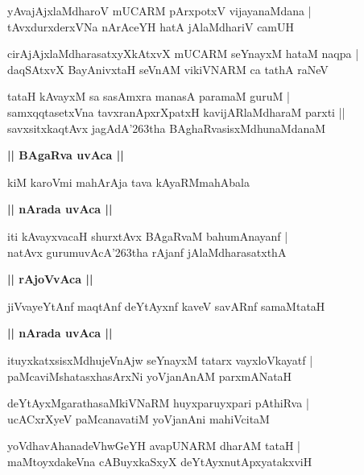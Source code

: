 \documentclass[twoside,12pt,openright]{book}
\def\S{\char'263}
\newcounter{shloka}[chapter]
\def\uvaca#1{\centerline{{\large\textbf{#1}}}}
\begin{document}
\begin{shloka}%
yAvajAjxlaMdharoV mUCARM pArxpotxV vijayanaMdana |\\
tAvxdurxderxVNa nArAceYH hatA jAlaMdhariV camUH
\end{shloka}

\begin{shloka}%
cirAjAjxlaMdharasatxyXkAtxvX mUCARM seYnayxM hataM naqpa |\\
daqSAtxvX BayAnivxtaH seVnAM vikiVNARM ca tathA raNeV
\end{shloka}

\begin{shloka}%
tataH kAvayxM sa sasAmxra manasA paramaM guruM |\\
samxqqtasetxVna tavxranApxrXpatxH kavijARlaMdharaM parxti ||\\
savxsitxkaqtAvx jagAdA\S tha BAghaRvasisxMdhunaMdanaM
\end{shloka}

\uvaca{|| BAgaRva uvAca ||}

\begin{shloka}%
kiM karoVmi mahArAja tava kAyaRMmahAbala 
\end{shloka}

\uvaca{|| nArada uvAca ||}

\begin{shloka}%
iti kAvayxvacaH shurxtAvx BAgaRvaM bahumAnayanf |\\
natAvx gurumuvAcA\S tha rAjanf jAlaMdharasatxthA 
\end{shloka}

\uvaca{|| rAjoVvAca ||}

\begin{shloka}%
jiVvayeYtAnf maqtAnf deYtAyxnf kaveV savARnf samaMtataH 
\end{shloka}

\uvaca{|| nArada uvAca ||}

\begin{shloka}%
ituyxkatxsisxMdhujeVnAjw seYnayxM tatarx vayxloVkayatf |\\
paMcaviMshatasxhasArxNi yoVjanAnAM parxmANataH 
\end{shloka}

\begin{shloka}%
deYtAyxMgarathasaMkiVNaRM huyxparuyxpari pAthiRva |\\
ucACxrXyeV paMcanavatiM yoVjanAni mahiVcitaM 
\end{shloka}

\begin{shloka}%
yoVdhavAhanadeVhwGeYH avapUNARM dharAM tataH |\\
maMtoyxdakeVna cABuyxkaSxyX deYtAyxnutApxyatakxviH
\end{shloka}
\end{document}
